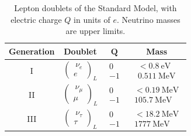 \documentclass[11pt,a4paper,twoside,openright]{report}
\begin{document}
\begin{table}[htbp]
    \centering
    \begin{tabular*}{\textwidth}{@{\extracolsep{\fill}}cccc@{}}
        \toprule
        \textbf{Generation} & \textbf{Doublet} & $\boldsymbol{Q}$ & \textbf{Mass} \\
        \midrule
        I &
        $\begin{pmatrix}\ \nu_e \\ e \end{pmatrix}_L$ &
        $\begin{matrix} 0 \\ -1 \end{matrix}$ &
        $\begin{matrix} < 0.8~\text{eV} \\ 0.511~\text{MeV} \end{matrix}$ \\
        \midrule
        II &
        $\begin{pmatrix}\ \nu_\mu \\ \mu \end{pmatrix}_L$ &
        $\begin{matrix} 0 \\ -1 \end{matrix}$ &
        $\begin{matrix} < 0.19~\text{MeV} \\ 105.7~\text{MeV} \end{matrix}$ \\
        \midrule
        III &
        $\begin{pmatrix}\ \nu_\tau \\ \tau \end{pmatrix}_L$ &
        $\begin{matrix} 0 \\ -1 \end{matrix}$ &
        $\begin{matrix} < 18.2~\text{MeV} \\ 1777~\text{MeV} \end{matrix}$ \\
        \bottomrule
    \end{tabular*}
    \caption{Lepton doublets of the Standard Model, with electric charge $Q$ in units of $e$.  Neutrino masses are upper limits.}
    \label{tab:sm_leptons}
\end{table}
\end{document}
